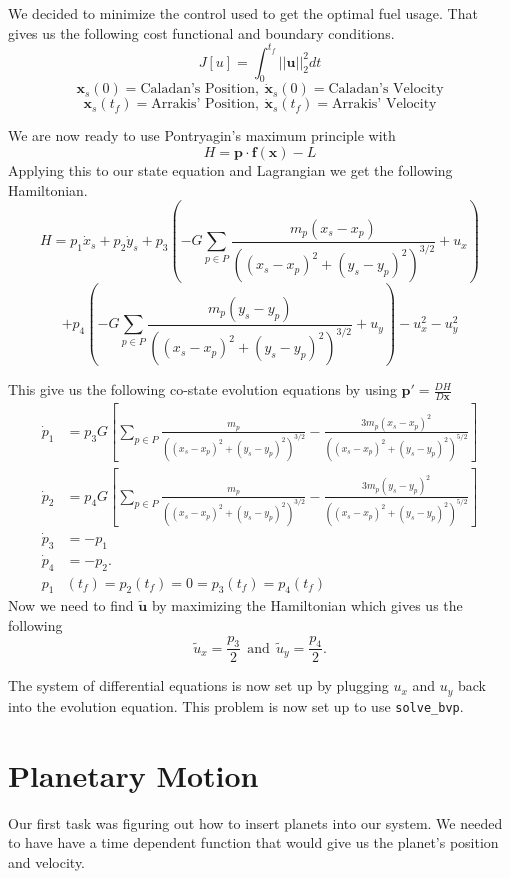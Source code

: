 \documentclass[11pt]{amsart}
\begin{document}
We decided to minimize the control used to get the optimal fuel usage. That gives us the following cost functional and boundary conditions. 
\[J[u] = \int_{0}^{t_f}||\mathbf{u}||_2^2dt\]
\[\mathbf{x}_s(0) = \text{Caladan's Position},\: \dot{\mathbf{x}}_s(0) = \text{Caladan's Velocity}\]
\[\mathbf{x}_s(t_f) = \text{Arrakis' Position},\: \dot{\mathbf{x}}_s(t_f) = \text{Arrakis' Velocity}\]

We are now ready to use Pontryagin's maximum principle with 
\[H = \mathbf{p}\cdot\mathbf{f(\mathbf{x})} - L\]
Applying this to our state equation and Lagrangian we get the following Hamiltonian.
\[H = p_1\dot{x}_s + p_2\dot{y}_s + p_3(-G\sum_{p\in{P}}^{}\frac{m_p(x_s - x_p)}{((x_s-x_p)^2+(y_s-y_p)^2)^{3/2}} + u_x)\]
\[+ p_4(-G\sum_{p\in{P}}^{}\frac{m_p(y_s - y_p)}{((x_s-x_p)^2+(y_s-y_p)^2)^{3/2}} + u_y) - u_x^2 - u_y^2\]

This give us the following co-state evolution equations by using $\mathbf{p}' = \frac{DH}{D\mathbf{x}}$
\begin{align*}
    \dot{p}_1 &= p_3G[\sum_{p\in{P}}^{}\frac{m_p}{((x_s-x_p)^2+(y_s-y_p)^2)^{3/2}} - \frac{3m_p(x_s - x_p)^2}{((x_s-x_p)^2+(y_s-y_p)^2)^{5/2}}] \\
    \dot{p}_2 &= p_4G[\sum_{p\in{P}}^{}\frac{m_p}{((x_s-x_p)^2+(y_s-y_p)^2)^{3/2}} - \frac{3m_p(y_s - y_p)^2}{((x_s-x_p)^2+(y_s-y_p)^2)^{5/2}}] \\
    \dot{p}_3 &= -p_1 \\
    \dot{p}_4 &= -p_2. \\
    p_1&(t_f)= p_2(t_f) = 0 = p_3(t_f) = p_4(t_f)
\end{align*}
Now we need to find $\tilde{\mathbf{u}}$ by maximizing the Hamiltonian which gives us the following
\[\tilde{u}_x = \frac{p_3}{2} \:\:\text{and}\:\: \tilde{u}_y = \frac{p_4}{2}.\]


The system of differential equations is now set up by plugging $u_x$ and $u_y$ back into the evolution equation. This problem is now set up to use \lstinline{solve_bvp}.

\section{Planetary Motion}
Our first task was figuring out how to insert planets into our system. We needed to have have a time dependent function that would give us the planet's position and velocity. 
\end{document}
